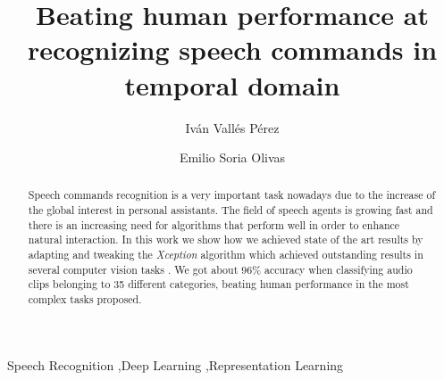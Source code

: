 \documentclass[review]{elsarticle}
\begin{document}
\begin{frontmatter}

\title{Beating human performance at recognizing speech commands in temporal domain}

\author[UV]{Iván Vallés Pérez}
\author[UV]{Emilio Soria Olivas}






\address[UV]{Escola Tècnica Superior d\textsc{}Enginyeria, University of Valencia, Avenida de la Universitat s/n 46100 Burjassot, Valencia, Spain}

\begin{abstract}
Speech commands recognition is a very important task nowadays due to the increase of the global interest in personal assistants. The field of speech agents is growing fast and there is an increasing need for algorithms that perform well in order to enhance natural interaction. In this work we show how we achieved state of the art results by adapting and tweaking the \textit{Xception} \cite{FChollet2017} algorithm which achieved outstanding results in several computer vision tasks \cite{Liu2019, Nazar2018, Song2018, Arriaga2017}. We got about 96\% accuracy when classifying audio clips belonging to 35 different categories, beating human performance in the most complex tasks proposed.
\end{abstract}

\begin{keyword}
Speech Recognition \sep Deep Learning \sep Representation Learning
\end{keyword}

\end{frontmatter}
\end{document}
